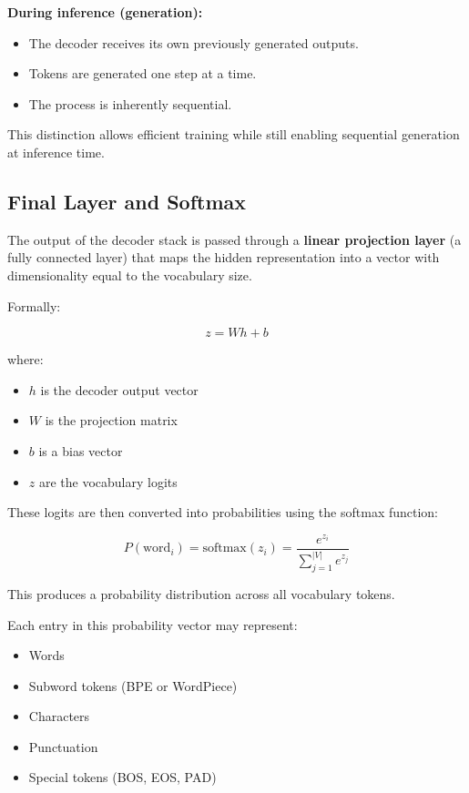 \documentclass[11pt]{article}
\begin{document}
\textbf{During inference (generation):}

\begin{itemize}

\item The decoder receives its own previously generated outputs.
\item Tokens are generated one step at a time.
\item The process is inherently sequential.

\end{itemize}

This distinction allows efficient training while still enabling sequential generation at inference time.

\subsection{Final Layer and Softmax}

The output of the decoder stack is passed through a \textbf{linear projection layer} (a fully connected layer) that maps the hidden representation into a vector with dimensionality equal to the vocabulary size.

Formally:

\[
z = W h + b
\]

where:

\begin{itemize}[nosep]

\item $h$ is the decoder output vector
\item $W$ is the projection matrix
\item $b$ is a bias vector
\item $z$ are the vocabulary logits

\end{itemize}

These logits are then converted into probabilities using the softmax function:

\[
P(\text{word}_i)
=
\text{softmax}(z_i)
=
\frac{e^{z_i}}
{\sum_{j=1}^{|V|} e^{z_j}}
\]

This produces a probability distribution across all vocabulary tokens.

Each entry in this probability vector may represent:

\begin{itemize}

\item Words
\item Subword tokens (BPE or WordPiece)
\item Characters
\item Punctuation
\item Special tokens (BOS, EOS, PAD)

\end{itemize}
\end{document}
